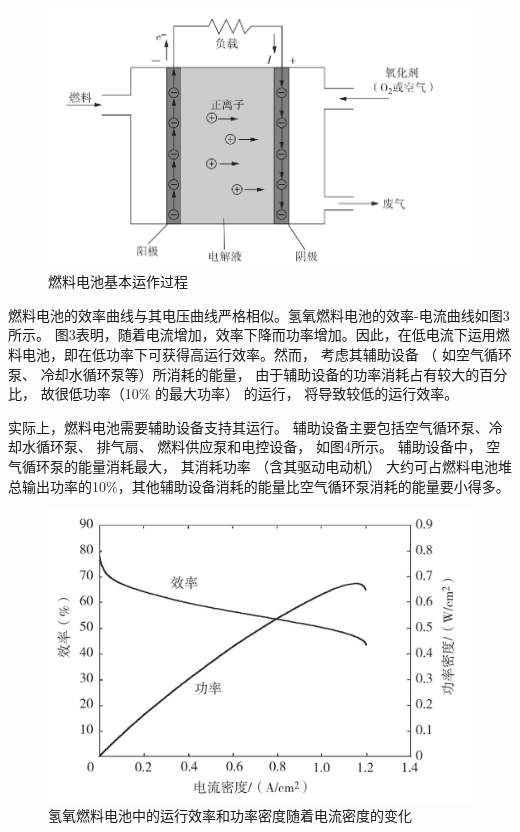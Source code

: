 \documentclass[UTF8,a4paper,11pt]{article}
\begin{document}
\begin{figure}[htbp]
\centering
\includegraphics[scale=0.6]{p2.png}
\caption{燃料电池基本运作过程}
\end{figure}

燃料电池的效率曲线与其电压曲线严格相似。氢氧燃料电池的效率-电流曲线如图3所示。 图3表明，随着电流增加，效率下降而功率增加。因此，在低电流下运用燃料电池，即在低功率下可获得高运行效率。然而， 考虑其辅助设备 （ 如空气循环泵、 冷却水循环泵等）所消耗的能量， 由于辅助设备的功率消耗占有较大的百分比， 故很低功率（10\% 的最大功率） 的运行， 将导致较低的运行效率。 

实际上，燃料电池需要辅助设备支持其运行。 辅助设备主要包括空气循环泵、冷却水循环泵、 排气扇、 燃料供应泵和电控设备， 如图4所示。 辅助设备中， 空气循环泵的能量消耗最大， 其消耗功率 （含其驱动电动机） 大约可占燃料电池堆总输出功率的10\%，其他辅助设备消耗的能量比空气循环泵消耗的能量要小得多。

\begin{figure}[htbp]
\centering
\includegraphics[scale=0.45]{p3.png}
\caption{氢氧燃料电池中的运行效率和功率密度随着电流密度的变化}
\end{figure}
\end{document}
